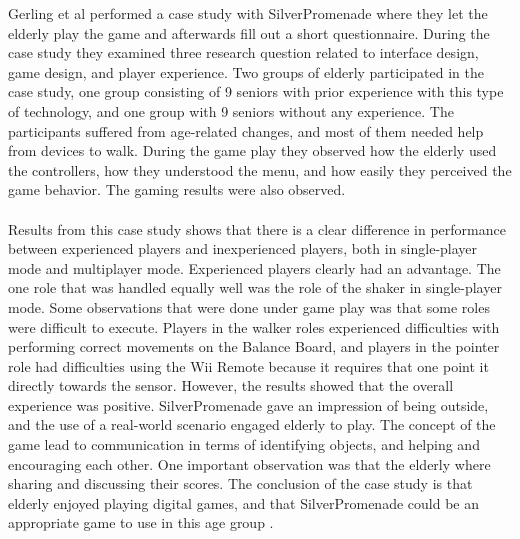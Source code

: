 Gerling et al performed a case study with SilverPromenade where they let the elderly play the game and afterwards fill out a short questionnaire. During the case study they examined three research question related to interface design, game design, and player experience. Two groups of elderly participated in the case study, one group consisting of 9 seniors with prior experience with this type of  technology, and one group with 9 seniors without any experience. The participants suffered from age-related changes, and most of them needed help from devices to walk. During the game play they observed how the elderly used the controllers, how they understood the menu, and how easily they perceived the game behavior. The gaming results were also observed. \\ \\
Results from this case study shows that there is a clear difference in performance between experienced players and inexperienced players, both in single-player mode and multiplayer mode. Experienced players clearly had an advantage. The one role that was handled equally well was the role of the shaker in single-player mode. Some observations that were done under game play was that some roles were difficult to execute. Players in the walker roles experienced difficulties with performing correct movements on the Balance Board, and players in the pointer role had difficulties using the Wii Remote because it requires that one point it directly towards the sensor. However, the results showed that the overall experience was positive. SilverPromenade gave an impression of being outside, and the use of a real-world scenario engaged elderly to play. The concept of the game lead to communication in terms of identifying objects, and helping and encouraging each other. One important observation was that the elderly where sharing and discussing their scores. The conclusion of the case study is that elderly enjoyed playing digital games, and that SilverPromenade could be an appropriate game to use in this age group \cite{gerling2}. 